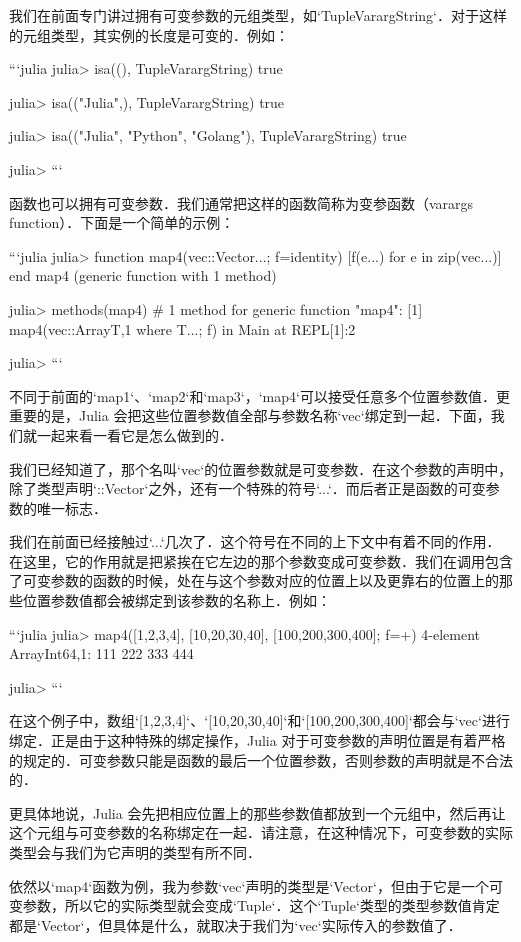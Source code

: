 我们在前面专门讲过拥有可变参数的元组类型，如`Tuple{Vararg{String}}`．对于这样的元组类型，其实例的长度是可变的．例如：

```julia
julia> isa((), Tuple{Vararg{String}})
true

julia> isa(("Julia",), Tuple{Vararg{String}})
true

julia> isa(("Julia", "Python", "Golang"), Tuple{Vararg{String}})
true

julia> 
```

函数也可以拥有可变参数．我们通常把这样的函数简称为变参函数（varargs function）．下面是一个简单的示例：

```julia
julia> function map4(vec::Vector...; f=identity)
           [f(e...) for e in zip(vec...)]
       end
map4 (generic function with 1 method)

julia> methods(map4)
# 1 method for generic function "map4":
[1] map4(vec::Array{T,1} where T...; f) in Main at REPL[1]:2

julia>  
```

不同于前面的`map1`、`map2`和`map3`，`map4`可以接受任意多个位置参数值．更重要的是，Julia 会把这些位置参数值全部与参数名称`vec`绑定到一起．下面，我们就一起来看一看它是怎么做到的．

我们已经知道了，那个名叫`vec`的位置参数就是可变参数．在这个参数的声明中，除了类型声明`::Vector`之外，还有一个特殊的符号`...`．而后者正是函数的可变参数的唯一标志．

我们在前面已经接触过`...`几次了．这个符号在不同的上下文中有着不同的作用．在这里，它的作用就是把紧挨在它左边的那个参数变成可变参数．我们在调用包含了可变参数的函数的时候，处在与这个参数对应的位置上以及更靠右的位置上的那些位置参数值都会被绑定到该参数的名称上．例如：

```julia
julia> map4([1,2,3,4], [10,20,30,40], [100,200,300,400]; f=+)
4-element Array{Int64,1}:
 111
 222
 333
 444

julia> 
```

在这个例子中，数组`[1,2,3,4]`、`[10,20,30,40]`和`[100,200,300,400]`都会与`vec`进行绑定．正是由于这种特殊的绑定操作，Julia 对于可变参数的声明位置是有着严格的规定的．可变参数只能是函数的最后一个位置参数，否则参数的声明就是不合法的．

更具体地说，Julia 会先把相应位置上的那些参数值都放到一个元组中，然后再让这个元组与可变参数的名称绑定在一起．请注意，在这种情况下，可变参数的实际类型会与我们为它声明的类型有所不同．

依然以`map4`函数为例，我为参数`vec`声明的类型是`Vector`，但由于它是一个可变参数，所以它的实际类型就会变成`Tuple`．这个`Tuple`类型的类型参数值肯定都是`Vector`，但具体是什么，就取决于我们为`vec`实际传入的参数值了．

